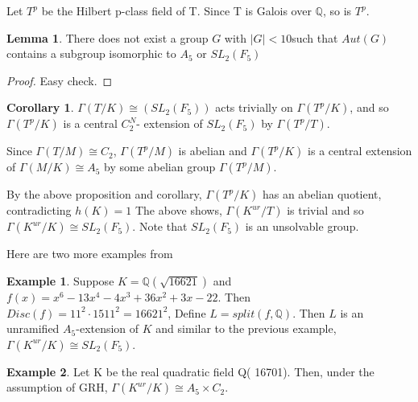 \documentclass[12pt]{extarticle}
\newcommand{\Q}{\mathbb{Q}}
\newcommand{\<}{\langle}
\renewcommand{\>}{\rangle}
\theoremstyle{definition}
\newtheorem{corollary}{Corollary}
\newtheorem*{example}{Example}
\newtheorem{lemma}{Lemma}
\begin{document}
Let $T^p$ be the Hilbert p-class field of T. Since T is Galois over $\Q$, so is $T^p$.
\begin{lemma}
There does not exist a group $G$ with $|G| < 10 $such that $Aut(G)$ contains a subgroup isomorphic to $A_5$ or $SL_2(F_5)$
\end{lemma}
\begin{proof}
Easy check. 
\end{proof}
\begin{corollary}
 $\Gamma(T/K) \cong (SL_2(F_5))$ acts trivially on $\Gamma(T^p/K)$, and so $\Gamma(T^p/K)$ is a central $C_2^N$- extension of $SL_2(F_5)$ by $\Gamma(T^p/T)$. \par
Since $\Gamma(T/M) \cong C_2$, $\Gamma(T^p/M)$ is abelian and $\Gamma(T^p/K)$ is a central extension of $\Gamma(M/K) \cong A_5$ by some abelian group $\Gamma(T^p/M)$.
\end{corollary}
 By the above proposition and corollary, $\Gamma(T^p/K)$ has an abelian quotient, contradicting $h(K)=1$
The above shows, $\Gamma(K^{ur}/T)$ is trivial and so $\Gamma(K^{ur}/K) \cong SL_2(F_5)$. Note that $SL_2(F_5)$ is an unsolvable group. 
 \par
Here are two more examples from \cite{KIM2017}
\begin{example}
Suppose $K = \Q(\sqrt{16621})$ and $f(x) = x^6-13x^4-4x^3 +36x^2 +3x-22$. Then $Disc(f) = 11^2 \cdot 1511^2 = 16621^2$, Define $L= split(f,\Q)$. Then $L$ is an unramified $A_5$-extension of $K$ and similar to the previous example, $\Gamma(K^{ur}/K) \cong SL_2(F_5)$.
\end{example}
\begin{example}
Let K be the real quadratic field Q( 16701). Then, under the assumption of GRH,  $\Gamma(K^{ur}/K) \cong A_5 \times C_2$.
\end{example}





\end{document}
